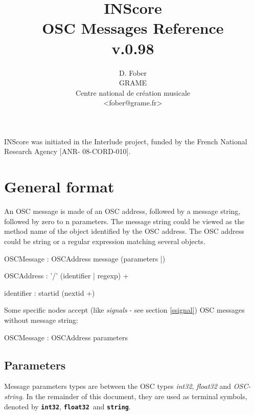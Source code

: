 \documentclass[a4paper,twoside]{report}
\newcommand{\toplevel}[1]	{\chapter{#1}}
\newcommand{\sublevel}[1]	{\section{#1}}
\newcommand{\osctype}[1]{\textbf{\texttt{{\small #1}}}}
\newcommand{\oscint}{\osctype{int32}}
\newcommand{\oscfloat}{\osctype{float32}}
\newcommand{\oscstring}{\osctype{string}}
\begin{document}
\title{INScore \\ OSC Messages Reference \\v.0.98}

\author{D. Fober\\ GRAME\\ Centre national de cr\'eation musicale\\
{\small <fober@grame.fr>} \\
}

\maketitle

\vspace*{22cm}
{\small INScore was initiated in the Interlude project, funded by the French National Research Agency [ANR- 08-CORD-010].}
  

\pagestyle{empty}
\cleardoublepage
\tableofcontents
\newpage
\pagestyle{plain}
\setcounter{page}{1}

\toplevel{General format}
\label{genformat}
An OSC message is made of an OSC address, followed by a message string, followed by zero to n parameters. The message string could be viewed as the method name of the object identified by the OSC address.
The OSC address could be string or a regular expression matching several objects.
\begin{rail}
OSCMessage : OSCAddress message (parameters |)
\end{rail}

\begin{rail}
OSCAddress : '/' (identifier | regexp) +
\end{rail}

\railalias{nextid}{[-\_a-zA-Z0-9]]}
\begin{rail}
identifier : startid (nextid +)
\end{rail}

Some specific nodes accept (like \emph{signals} - see section \ref{ssignal}) OSC messages without message string:
\begin{rail}
OSCMessage : OSCAddress parameters
\end{rail}

\sublevel{Parameters}

Message parameters types are between the OSC types \emph{int32}, \emph{float32} and \emph{OSC-string}. In the remainder of this document, they are used as terminal symbols, denoted by \oscint, \oscfloat\ and \oscstring. 
\end{document}
